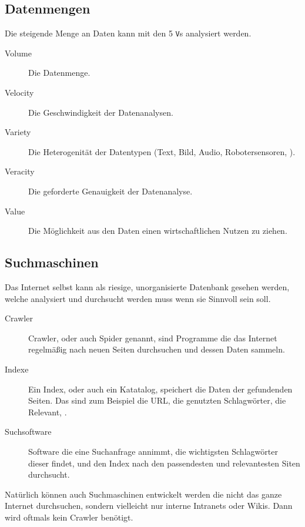 \documentclass{article}
\begin{document}
\subsection{Datenmengen}
Die steigende Menge an Daten kann mit den 5 \texttt{V}s analysiert werden.
\begin{description}
 \item[Volume] Die Datenmenge.
 \item[Velocity] Die Geschwindigkeit der Datenanalysen.
 \item[Variety] Die Heterogenität der Datentypen (Text, Bild, Audio, Robotersensoren, \etc).
 \item[Veracity] Die geforderte Genauigkeit der Datenanalyse.
 \item[Value] Die Möglichkeit aus den Daten einen wirtschaftlichen Nutzen zu ziehen. 
\end{description}

\subsection{Suchmaschinen}
Das Internet selbst kann als riesige, unorganisierte Datenbank gesehen werden, welche analysiert und durchsucht werden muss wenn sie Sinnvoll sein soll.
\begin{description}
 \item[Crawler] Crawler, oder auch Spider genannt, sind Programme die das Internet regelmäßig nach neuen Seiten durchsuchen und dessen Daten sammeln.
 \item[Indexe] Ein Index, oder auch ein Katatalog, speichert die Daten der gefundenden Seiten. Das sind zum Beispiel die URL, die genutzten Schlagwörter, die Relevant, \etc.
 \item[Suchsoftware] Software die eine Suchanfrage annimmt, die wichtigsten Schlagwörter dieser findet, und den Index nach den passendesten und relevantesten Siten durchsucht.
\end{description}
Natürlich können auch Suchmaschinen entwickelt werden die nicht das ganze Internet durchsuchen, sondern vielleicht nur interne Intranets oder Wikis. Dann wird oftmals kein Crawler benötigt.
\end{document}
